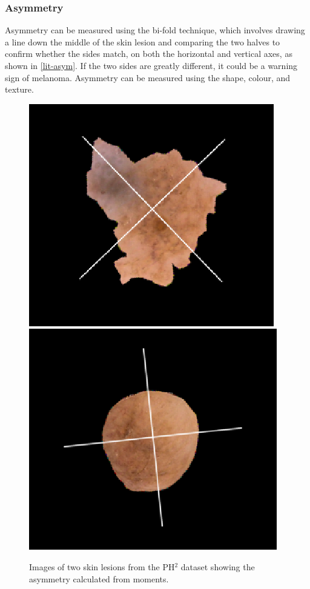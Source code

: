 \subsubsection{Asymmetry}
Asymmetry can be measured using the bi-fold technique, which involves drawing a line down the middle of the skin lesion and comparing the two halves to confirm whether the sides match, on both the horizontal and vertical axes, as shown in \ref{lit-asym}. If the two sides are greatly different, it could be a warning sign of melanoma. Asymmetry can be measured using the shape\cite{Zaqout2016}, colour\cite{Kasmi2016}, and texture\cite{Ali2020a}.

\begin{figure} 
\centering
\includegraphics[scale=0.5]{images/asym1.png}
\includegraphics[scale=0.5]{images/asym2.png}
\caption{Images of two skin lesions from the PH$^2$ dataset showing the asymmetry calculated from moments.}
\end{figure} \label{lit-asym}

